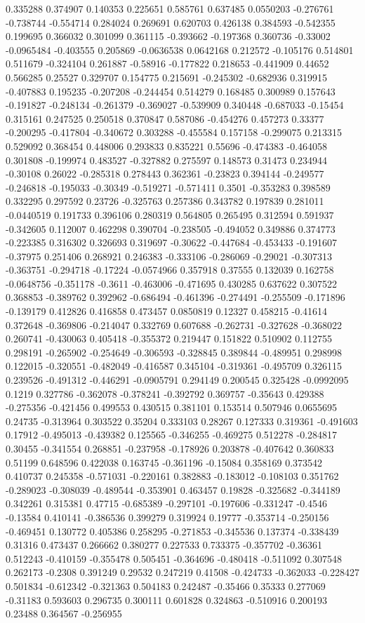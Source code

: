 0.335288 0.374907 0.140353 0.225651 0.585761 0.637485 0.0550203 -0.276761 -0.738744 -0.554714 0.284024 0.269691 0.620703 0.426138 0.384593 -0.542355 0.199695 0.366032 0.301099 0.361115 -0.393662 -0.197368 0.360736 -0.33002 -0.0965484 -0.403555 0.205869 -0.0636538 0.0642168 0.212572 -0.105176 0.514801 0.511679 -0.324104 0.261887 -0.58916 -0.177822 0.218653 -0.441909 0.44652 0.566285 0.25527 0.329707 0.154775 0.215691 -0.245302 -0.682936 0.319915 -0.407883 0.195235 -0.207208 -0.244454 0.514279 0.168485 0.300989 0.157643 -0.191827 -0.248134 -0.261379 -0.369027 -0.539909 0.340448 -0.687033 -0.15454 0.315161 0.247525 0.250518 0.370847 0.587086 -0.454276 0.457273 0.33377 -0.200295 -0.417804 -0.340672 0.303288 -0.455584 0.157158 -0.299075 0.213315 0.529092 0.368454 0.448006 0.293833 0.835221 0.55696 -0.474383 -0.464058 0.301808 -0.199974 0.483527 -0.327882 0.275597 0.148573 0.31473 0.234944 -0.30108 0.26022 -0.285318 0.278443 0.362361 -0.23823 0.394144 -0.249577 -0.246818 -0.195033 -0.30349 -0.519271 -0.571411 0.3501 -0.353283 0.398589 0.332295 0.297592 0.23726 -0.325763 0.257386 0.343782 0.197839 0.281011 -0.0440519 0.191733 0.396106 0.280319 0.564805 0.265495 0.312594 0.591937 -0.342605 0.112007 0.462298 0.390704 -0.238505 -0.494052 0.349886 0.374773 -0.223385 0.316302 0.326693 0.319697 -0.30622 -0.447684 -0.453433 -0.191607 -0.37975 0.251406 0.268921 0.246383 -0.333106 -0.286069 -0.29021 -0.307313 -0.363751 -0.294718 -0.17224 -0.0574966 0.357918 0.37555 0.132039 0.162758 -0.0648756 -0.351178 -0.3611 -0.463006 -0.471695 0.430285 0.637622 0.307522 0.368853 -0.389762 0.392962 -0.686494 -0.461396 -0.274491 -0.255509 -0.171896 -0.139179 0.412826 0.416858 0.473457 0.0850819 0.12327 0.458215 -0.41614 0.372648 -0.369806 -0.214047 0.332769 0.607688 -0.262731 -0.327628 -0.368022 0.260741 -0.430063 0.405418 -0.355372 0.219447 0.151822 0.510902 0.112755 0.298191 -0.265902 -0.254649 -0.306593 -0.328845 0.389844 -0.489951 0.298998 0.122015 -0.320551 -0.482049 -0.416587 0.345104 -0.319361 -0.495709 0.326115 0.239526 -0.491312 -0.446291 -0.0905791 0.294149 0.200545 0.325428 -0.0992095 0.1219 0.327786 -0.362078 -0.378241 -0.392792 0.369757 -0.35643 0.429388 -0.275356 -0.421456 0.499553 0.430515 0.381101 0.153514 0.507946 0.0655695 0.24735 -0.313964 0.303522 0.35204 0.333103 0.28267 0.127333 0.319361 -0.491603 0.17912 -0.495013 -0.439382 0.125565 -0.346255 -0.469275 0.512278 -0.284817 0.30455 -0.341554 0.268851 -0.237958 -0.178926 0.203878 -0.407642 0.360833 0.51199 0.648596 0.422038 0.163745 -0.361196 -0.15084 0.358169 0.373542 0.410737 0.245358 -0.571031 -0.220161 0.382883 -0.183012 -0.108103 0.351762 -0.289023 -0.308039 -0.489544 -0.353901 0.463457 0.19828 -0.325682 -0.344189 0.342261 0.315381 0.47715 -0.685389 -0.297101 -0.197606 -0.331247 -0.4546 -0.13584 0.410141 -0.386536 0.399279 0.319924 0.19777 -0.353714 -0.250156 -0.469451 0.130772 0.405386 0.258295 -0.271853 -0.345536 0.137374 -0.338439 0.31316 0.473437 0.266662 0.380277 0.227533 0.733375 -0.357702 -0.36361 0.512243 -0.410159 -0.355478 0.505451 -0.364696 -0.480418 -0.511092 0.307548 0.262173 -0.2308 0.391249 0.29532 0.247219 0.41508 -0.424733 -0.362033 -0.228427 0.501834 -0.612342 -0.321363 0.504183 0.242487 -0.35466 0.35333 0.277069 -0.31183 0.593603 0.296735 0.300111 0.601828 0.324863 -0.510916 0.200193 0.23488 0.364567 -0.256955 